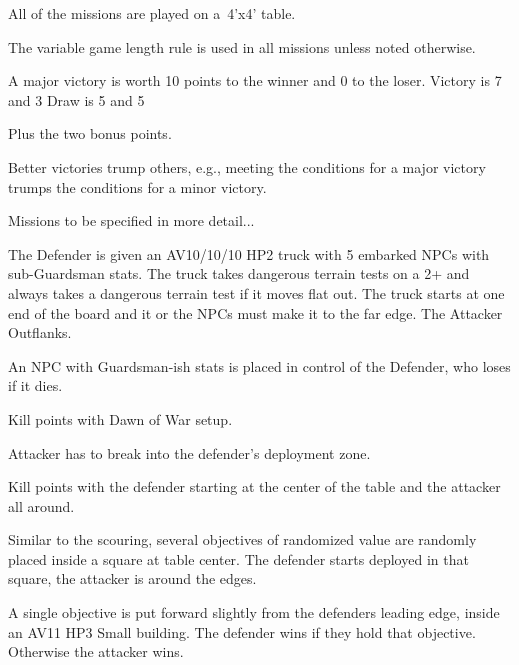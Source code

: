 \clearpage
{}


All of the missions are played on a~4'x4' table.

The variable game length rule is used in all missions unless noted otherwise.

A major victory is worth 10 points to the winner and 0 to the loser.
Victory is 7 and 3
Draw is 5 and 5

Plus the two bonus points.

Better victories trump others, e.g., meeting the conditions for a
major victory trumps the conditions for a minor victory.

Missions to be specified in more detail...


The Defender is given an AV10/10/10 HP2 truck with 5 embarked NPCs
with sub-Guardsman stats.  The truck takes dangerous terrain tests on
a 2+ and always takes a dangerous terrain test if it moves flat out.
The truck starts at one end of the board and it or the NPCs must make
it to the far edge.  The Attacker Outflanks.



An NPC with Guardsman-ish stats is placed in control of the Defender,
who loses if it dies.



Kill points with Dawn of War setup.



Attacker has to break into the defender's deployment zone.



Kill points with the defender starting at the center of the table and
the attacker all around.



Similar to the scouring, several objectives of randomized value are
randomly placed inside a square at table center.  The defender starts
deployed in that square, the attacker is around the edges.



A single objective is put forward slightly from the defenders leading
edge, inside an AV11 HP3 Small building.  The defender wins if they
hold that objective.  Otherwise the attacker wins.


